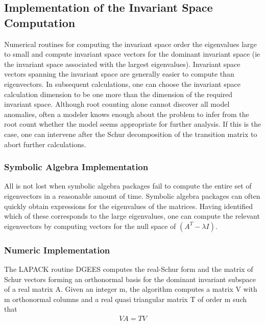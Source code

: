 \documentclass{article}
\begin{document}
{\subsection{Implementation of the Invariant Space Computation}

Numerical routines for computing the invariant space order the eigenvalues
large to small and compute invariant space vectors for the dominant invariant
space (ie the invariant space associated with the largest eigenvalues).
Invariant space vectors spanning the invariant space are generally easier
to compute than eigenvectors.
In subsequent calculations, one can 
choose the invariant space calculation dimension
 to be one  more than the dimension of the required invariant
space. 
Although root counting alone cannot discover all model anomalies, often
a modeler knows enough about the problem to infer from the root count
whether the model seems appropriate for further analysis.
If this is the case, one can intervene after the Schur decomposition
of the transition matrix to 
abort further calculations.



\subsubsection{Symbolic Algebra Implementation}



All is not lost when 
symbolic algebra packages fail to compute the entire set of
eigenvectors in a reasonable amount of time.
Symbolic algebra packages can often quickly obtain expressions for the
eigenvalues of the matrices. Having identified which of these corresponds to
the large eigenvalues, one can compute the relevant
eigenvectors by computing vectors for
the null space of $(A^T-\lambda I)$.

\subsubsection{ Numeric Implementation}

The LAPACK routine DGEES computes the real-Schur form and the matrix of Schur
vectors forming an  orthonormal basis for the dominant invariant subspace of 
a real matrix A. Given an integer m, the algorithm computes a matrix V with
m orthonormal columns and a
real quasi triangular matrix T of order m such that 
\begin{gather*}
V A  =   T V
\end{gather*}

}
\end{document}

